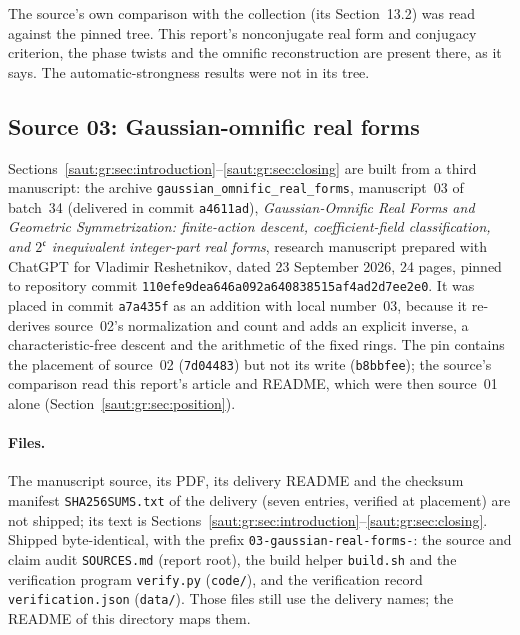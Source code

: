 \documentclass[11pt]{article}
\theoremstyle{definition}
\theoremstyle{remark}
\numberwithin{equation}{section}
\begin{document}
The source's own comparison with the collection (its Section~13.2) was read against
the pinned tree. This report's nonconjugate real form and conjugacy criterion, the
phase twists and the omnific reconstruction are present there, as it says. The
automatic-strongness results were not in its tree.

\subsection{Source 03: Gaussian-omnific real forms}\label{saut:app:source03}

Sections~\ref{saut:gr:sec:introduction}--\ref{saut:gr:sec:closing} are built from a
third manuscript: the archive \texttt{gaussian\_omnific\_real\_forms}, manuscript~03 of
batch~34 (delivered in commit \texttt{a4611ad}), \emph{Gaussian-Omnific Real Forms and
Geometric Symmetrization: finite-action descent, coefficient-field classification, and
$2^{\mathfrak c}$ inequivalent integer-part real forms}, research manuscript prepared
with ChatGPT for Vladimir Reshetnikov, dated 23 September 2026, 24 pages, pinned to
repository commit \texttt{110efe9dea646a092a640838515af4ad2d7ee2e0}. It was placed in
commit \texttt{a7a435f} as an addition with local number~03, because it re-derives
source~02's normalization and count and adds an explicit inverse, a
characteristic-free descent and the arithmetic of the fixed rings. The pin contains the
placement of source~02 (\texttt{7d04483}) but not its write (\texttt{b8bbfee}); the
source's comparison read this report's article and README, which were then source~01
alone (Section~\ref{saut:gr:sec:position}).

\paragraph{Files.} The manuscript source, its PDF, its delivery README and the checksum
manifest \texttt{SHA256SUMS.txt} of the delivery (seven entries, verified at placement)
are not shipped;
its text is Sections~\ref{saut:gr:sec:introduction}--\ref{saut:gr:sec:closing}. Shipped
byte-identical, with the prefix \texttt{03-gaussian-real-forms-}: the source and claim
audit \texttt{SOURCES.md} (report root), the build helper \texttt{build.sh} and the
verification program \texttt{verify.py} (\texttt{code/}), and the verification record
\texttt{verification.json} (\texttt{data/}). Those files still use the delivery names;
the README of this directory maps them.
\end{document}
